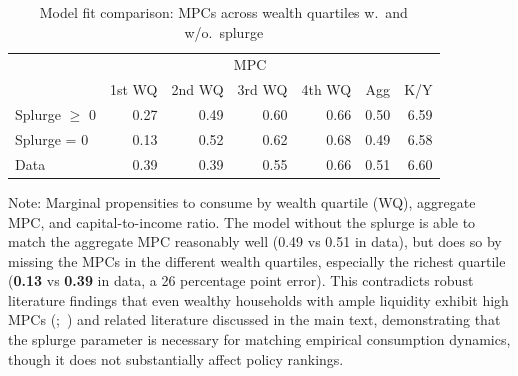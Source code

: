 \documentclass[\latexroot/\projectname]{subfiles}
\begin{document}
\begin{table}[tb] 
  \caption{\pregenmark Model fit comparison: MPCs across wealth quartiles w.\ and w/o.\ splurge}
  \whenintegrated{\label{tab:Comparison-Splurge-Table}} %
  \centering

  \begin{tabular*}
    {\textwidth}{@{\extracolsep{\fill}}lrrrrrr@{}} 
    \hline
    & \multicolumn{5}{c}{MPC} & \\
    & \multicolumn{1}{c}{1st WQ} & \multicolumn{1}{c}{2nd WQ} & \multicolumn{1}{c}{3rd WQ} & \multicolumn{1}{c}{4th WQ} & \multicolumn{1}{c}{Agg} & \multicolumn{1}{c}{K/Y} \\ \hline
    Splurge $\geq$ 0      & 0.27 & 0.49 & 0.60 & 0.66 & 0.50 & 6.59 \\
    Splurge = 0           & 0.13 & 0.52 & 0.62 & 0.68 & 0.49 & 6.58 \\
    \addlinespace
    Data                  & 0.39 & 0.39 & 0.55 & 0.66 & 0.51 & 6.60 \\
    \hline
  \end{tabular*}

  \noindent\parbox{\textwidth}{
    \medskip
    \footnotesize Note: Marginal propensities to consume by wealth quartile (WQ), aggregate MPC, and capital-to-income ratio. The model without the splurge is able to match the aggregate MPC reasonably well (0.49 vs 0.51 in data), but does so by missing the MPCs in the different wealth quartiles, especially the richest quartile (\textbf{0.13} vs \textbf{0.39} in data, a 26 percentage point error). This contradicts robust literature findings that even wealthy households with ample liquidity exhibit high MPCs (\cite{crawley2023MicroMacro};~\cite{graham2026mental}) and related literature discussed in the main text, demonstrating that the splurge parameter is necessary for matching empirical consumption dynamics, though it does not substantially affect policy rankings.
  }
\end{table}

\vspace{0.5em}

\smartbib
\end{document}
